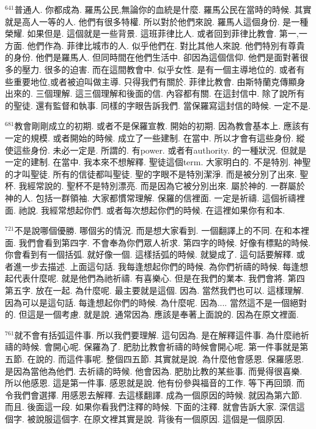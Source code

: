 \documentclass{book}
\begin{document}
$^{641}$普通人.
你都成為.
羅馬公民,無論你的血統是什麼.
羅馬公民在當時的時候.
其實就是高人一等的人.
他們有很多特權.
所以對於他們來說.
羅馬人這個身份.
是一種榮耀.
如果但是.
這個就是一些背景.
這班菲律比人.
或者回到菲律比教會.
第一,一方面.
他們作為.
菲律比城市的人.
似乎他們在.
對比其他人來說.
他們特別有尊貴的身份.
他們是羅馬人.
但同時間在他們生活中.
卻因為這個信仰.
他們是面對著很多的壓力.
很多的迫害.
而在這間教會中.
似乎女性.
是有一個主導地位的.
或者有些重要地位,或者被迫叫做主導.
只得我們有關於.
菲律比教會.
由斯特蘭克傳顯身出來的.
三個理解.
這三個理解和後面的信.
內容都有關.
在這封信中.
除了說所有的聖徒.
還有監督和執事.
同樣的字眼告訴我們.
當保羅寫這封信的時候.
一定不是.

$^{681}$教會剛剛成立的初期.
或者不是保羅宣教.
開始的初期.
因為教會基本上.
應該有一定的規模.
或者開始的時候.
成立了一些建制.
在當中.
所以才會有這些身份.
縱使這些身份.
未必一定是.
所謂的.
有power.
或者有authority.
的一種狀況.
但就是一定的建制.
在當中.
我本來不想解釋.
聖徒這個term.
大家明白的.
不是特別.
神聖的才叫聖徒.
所有的信徒都叫聖徒.
聖的字眼不是特別潔淨.
而是被分別了出來.
聖杯.
我經常說的.
聖杯不是特別漂亮.
而是因為它被分別出來.
屬於神的.
一群屬於神的人.
包括一群領袖.
大家都慣常理解.
保羅的信裡面.
一定是祈禱.
這個祈禱裡面.
祂說.
我經常想起你們.
或者每次想起你們的時候.
在這裡如果你有和本.

$^{721}$不是說哪個優勝.
哪個劣的情況.
而是想大家看到.
一個翻譯上的不同.
在和本裡面.
我們會看到第四字.
不會奉為你們眾人祈求.
第四字的時候.
好像有標點的時候.
你會看到有一個括弧.
就好像一個.
這樣括弧的時候.
就變成了.
這句話要解釋.
或者進一步去描述.
上面這句話.
我每逢想起你們的時候.
為你們祈禱的時候.
每逢想起代表什麼呢.
就是他們為祂祈禱.
有喜樂心.
但是在我們的業本.
我們會將.
第四第五字.
放在一起.
為什麼呢.
最主要就是這個.
因為.
當然我們也可以.
這樣理解.
因為可以是這句話.
每逢想起你們的時候.
為什麼呢.
因為....
當然這不是一個絕對的.
但這是一個考慮.
就是說.
通常因為.
應該是奉著上面說的.
因為在原文裡面.

$^{761}$就不會有括弧這件事.
所以我們要理解.
這句因為.
是在解釋這件事.
為什麼祂祈禱的時候.
會開心呢.
保羅為了.
肥肋比教會祈禱的時候會開心呢.
第一件事就是第五節.
在說的.
而這件事呢.
整個四五節.
其實就是說.
為什麼他會感恩.
保羅感恩.
是因為當他為他們.
去祈禱的時候.
他會因為.
肥肋比教的某些事.
而覺得很喜樂.
所以他感恩.
這是第一件事.
感恩就是說.
他有份參與福音的工作.
等下再回頭.
而令我們會選擇.
用感恩去解釋.
去這樣翻譯.
成為一個原因的時候.
就因為第六節.
而且.
後面這一段.
如果你看我們注釋的時候.
下面的注釋.
就會告訴大家.
深信這個字.
被說服這個字.
在原文裡其實是說.
背後有一個原因.
這個是一個原因.
\end{document}
